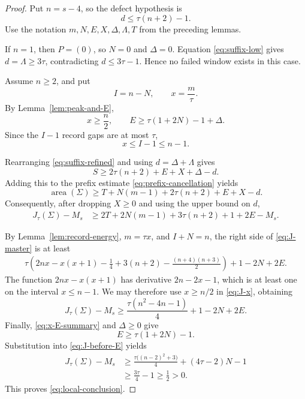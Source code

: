 \documentclass[11pt]{article}
\theoremstyle{definition}
\theoremstyle{remark}
\newcommand{\area}{\operatorname{area}}
\begin{document}
\begin{proof}
Put \(n=s-4\), so the defect hypothesis is
\[
  d\le\tau(n+2)-1.
\]
Use the notation \(m,N,E,X,\Delta,\Lambda,T\) from the preceding lemmas.

If \(n=1\), then \(P=(0)\), so \(N=0\) and \(\Delta=0\).  Equation
\eqref{eq:suffix-low} gives \(d=\Lambda\ge3\tau\), contradicting
\(d\le3\tau-1\).  Hence no failed window exists in this case.

Assume \(n\ge2\), and put
\[
  I=n-N,
  \qquad x=\frac m\tau.
\]
By Lemma~\ref{lem:peak-and-E},
\begin{equation}
  x\ge\frac n2,
  \qquad
  E\ge\tau(1+2N)-1+\Delta.
  \label{eq:x-E-summary}
\end{equation}
Since the \(I-1\) record gaps are at most \(\tau\),
\begin{equation}
  x\le I-1\le n-1.
  \label{eq:x-upper}
\end{equation}

Rearranging \eqref{eq:suffix-refined} and using
\(d=\Delta+\Lambda\) gives
\[
  S\ge2\tau(n+2)+E+X+\Delta-d.
\]
Adding this to the prefix estimate \eqref{eq:prefix-cancellation} yields
\begin{equation}
  \area(\Sigma)
  \ge T+N(m-1)+2\tau(n+2)+E+X-d.
  \label{eq:area-master}
\end{equation}
Consequently, after dropping \(X\ge0\) and using the upper bound on \(d\),
\begin{align}
  J_\tau(\Sigma)-M_s
  &\ge2T+2N(m-1)+3\tau(n+2)+1+2E-M_s.
  \label{eq:J-master}
\end{align}

By Lemma~\ref{lem:record-energy}, \(m=\tau x\), and \(I+N=n\), the
right side of \eqref{eq:J-master} is at least
\begin{align}
  \tau\left(
    2nx-x(x+1)-\frac14+3(n+2)
    -\frac{(n+4)(n+3)}2
  \right)
  +1-2N+2E.
  \label{eq:J-x}
\end{align}
The function \(2nx-x(x+1)\) has derivative \(2n-2x-1\), which is at
least one on the interval \(x\le n-1\).  We may therefore use
\(x\ge n/2\) in \eqref{eq:J-x}, obtaining
\begin{equation}
  J_\tau(\Sigma)-M_s
  \ge
  \frac{\tau(n^2-4n-1)}4+1-2N+2E.
  \label{eq:J-before-E}
\end{equation}
Finally, \eqref{eq:x-E-summary} and \(\Delta\ge0\) give
\[
  E\ge\tau(1+2N)-1.
\]
Substitution into \eqref{eq:J-before-E} yields
\begin{align*}
  J_\tau(\Sigma)-M_s
  &\ge
  \frac{\tau\bigl((n-2)^2+3\bigr)}4
  +(4\tau-2)N-1\\
  &\ge \frac{3\tau}{4}-1
  \ge\frac12>0.
\end{align*}
This proves \eqref{eq:local-conclusion}.
\end{proof}
\end{document}
